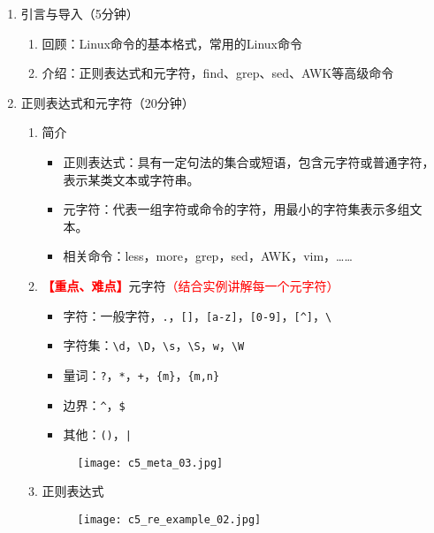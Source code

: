 \documentclass{TIJMUjiaoanLL}
\begin{document}
\firstTail


\newpage
\otherHeader

\begin{enumerate}
  \item 引言与导入（5分钟）
    \begin{enumerate}
      \item 回顾：Linux命令的基本格式，常用的Linux命令
      \item 介绍：正则表达式和元字符，find、grep、sed、AWK等高级命令
    \end{enumerate}

  \item 正则表达式和元字符（20分钟）
    \begin{enumerate}
      \item 简介
	\begin{itemize}
	  \item 正则表达式：具有一定句法的集合或短语，包含元字符或普通字符，表示某类文本或字符串。
	  \item 元字符：代表一组字符或命令的字符，用最小的字符集表示多组文本。
	  \item 相关命令：less，more，grep，sed，AWK，vim，……
	\end{itemize}
      \item \textcolor{red}{\textbf{【重点、难点】}}元字符\textcolor{red}{（结合实例讲解每一个元字符）}
	\begin{itemize}
	  \item 字符：一般字符，\verb|.|，\verb|[]|，\verb|[a-z]|，\verb|[0-9]|，\verb|[^]|，\verb|\|
	  \item 字符集：\verb|\d|，\verb|\D|，\verb|\s|，\verb|\S|，\verb|w|，\verb|\W|
	  \item 量词：\verb|?|，\verb|*|，\verb|+|，\verb|{m}|，\verb|{m,n}|
	  \item 边界：\verb|^|，\verb|$|
	  \item 其他：\verb|()|，\verb=|=
	\end{itemize}
	\vspace*{-10pt}
	\begin{figure}[h]
	  \centering
	  \texttt{[image: c5\_meta\_03.jpg]}
	\end{figure}
	\vspace*{-10pt}
      \item 正则表达式
	\vspace*{-10pt}
	\begin{figure}[h]
	  \centering
	  \texttt{[image: c5\_re\_example\_02.jpg]}
	\end{figure}
	\vspace*{-10pt}
    \end{enumerate}



\end{enumerate}
\end{document}
